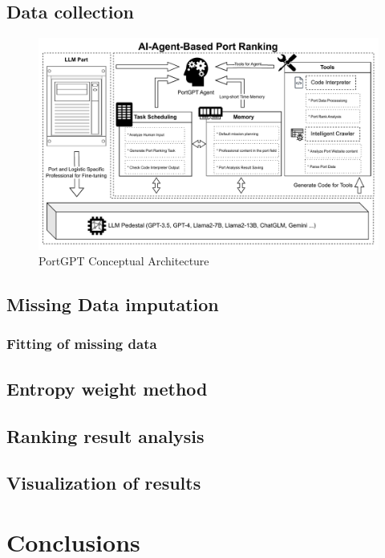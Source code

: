 \documentclass[preprint]{elsarticle}
\begin{document}
\subsection{Data collection}
\begin{figure}[H]
    \centering
    \includegraphics[width=1.0\textwidth]{pic/PortGPT.pdf}
    \caption{PortGPT Conceptual Architecture}
\end{figure}
\subsection{Missing Data imputation}
\subsubsection{Fitting of missing data }

\subsection{Entropy weight method}

\subsection{Ranking result analysis}
\subsection{Visualization of results}
\section{Conclusions}
% 
% 
% 
% 
% 
% 
% 
% 
% 
% 
% 
% 
\end{document}
